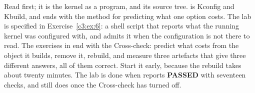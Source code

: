 Read  first; it is the kernel as a program, and its source tree. 
is Kconfig and Kbuild, and ends with the method for predicting what one option costs. The lab is
specified in Exercise~\ref{c3:ex:6}: a shell script that reports what the running kernel was
configured with, and admits it when the configuration is not there to read. The exercises in
 end with the Cross-check: predict what  costs from
the object it builds, remove it, rebuild, and measure three artefacts that give three different
answers, all of them correct. Start it early, because the rebuild takes about twenty minutes. The
lab is done when  reports \textbf{PASSED} with seventeen checks, and still does
once the Cross-check has turned  off.





